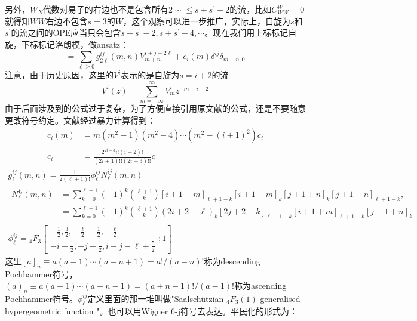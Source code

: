 另外，$W_N$代数对易子的右边也不是包含所有$2\sim\leq s+s^\prime-2$的流，比如$C^W_{WW}=0$就得知$WW$右边不包含$s=3$的$W$，这个观察可以进一步推广，实际上，自旋为$s$和$s^\prime$的流之间的OPE应当只会包含$s+s^\prime-2,s+s^\prime-4,\cdots$。现在我们用上标标记自旋，下标标记洛朗模，做ansatz：
\begin{equation}
	[V_m^i,V_n^j]=\sum_{\ell\geq0}g_{2\ell}^{ij}(m,n)V_{m+n}^{i+j-2\ell}+c_i(m)\delta^{ij}\delta_{m+n,0}
\end{equation}
注意，由于历史原因，这里的$V^i$表示的是自旋为$s=i+2$的流
\begin{equation}
	V^i(z)=\sum_{m=-\infty}^\infty V_m^iz^{-m-i-2}
\end{equation}
由于后面涉及到的公式过于复杂，为了方便直接引用原文献的公式，还是不要随意更改符号约定。文献\cite{Pope:1989ew,Pope:1989sr}经过暴力计算得到：
\begin{equation}
	\begin{aligned}
		c_i(m)&=m(m^2-1)(m^2-4)\cdots(m^2-(i+1)^2)c_i\\
		c_i&=\frac{2^{2i-3}i!\left(i+2\right)!}{\left(2i+1\right)!!\left(2i+3\right)!!}c
	\end{aligned}
\end{equation}
\begin{equation}
	\begin{gathered}
		g_{\ell}^{ij}(m,n)=\frac1{2(\ell+1)!}\phi_{\ell}^{ij}N_{\ell}^{ij}(m,n)\\
		\begin{aligned}
			N_{\ell}^{\boldsymbol{i}j}(m,n)& =\sum_{k=0}^{\ell+1}(-1)^k\binom{\ell+1}k[i+1+m]_{\ell+1-k}[i+1-m]_k[j+1+n]_k[j+1-n]_{\ell+1-k},  \\
			&=\sum_{k=0}^{\ell+1}(-1)^k\binom{\ell+1}k(2i+2-\ell)_k[2j+2-k]_{\ell+1-k}[i+1+m]_{\ell+1-k}[j+1+n]_k
		\end{aligned}\\
		\phi_\ell^{ij}={}_4F_3\left[\begin{array}{cc}-\frac12,\frac32,-\frac{\ell}2-\frac12,-\frac{\ell}2\\-i-\frac12,-j-\frac12,i+j-\ell+\frac52\end{array};1\right]
	\end{gathered}
\end{equation}
这里$[a]_n\equiv a(a-1)\cdots(a-n+1)=a!/(a-n)!$称为descending Pochhammer符号，$(a)_n\equiv a(a+1)\cdots(a+n-1)=(a+n-1)!/(a-1)!$称为ascending Pochhammer符号。$\phi_\ell^{ij}$定义里面的那一堆叫做"Saalschützian ${}_4F_3(1)$ generalised hypergeometric function "。也可以用Wigner 6\mbox{-}j符号去表达\cite{Pope:1989sr}。平民化的形式为：
